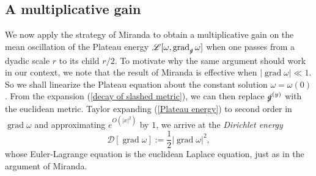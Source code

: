 \documentclass[reqno,12pt,letterpaper]{amsart}
\DeclareMathOperator{\grad}{grad}
\newcommand{\Lagrange}{\mathscr L}
\newcommand{\DirL}{\mathscr D}
\newcommand{\dfn}[1]{\emph{#1}\index{#1}}
\theoremstyle{definition}
\numberwithin{equation}{section}
\begin{document}
\subsection{A multiplicative gain}
We now apply the strategy of Miranda \cite[Teorema 4.3]{Miranda66} to obtain a multiplicative gain on the mean oscillation of the Plateau energy $\Lagrange[\omega, \grad_{\slashed g} \omega]$ when one passes from a dyadic scale $r$ to its child $r/2$.
To motivate why the same argument should work in our context, we note that the result of Miranda is effective when $|\grad \omega| \ll 1$.
So we shall linearize the Plateau equation about the constant solution $\omega = \omega(0)$.
From the expansion (\ref{decay of slashed metric}), we can then replace $\slashed g^{(y)}$ with the euclidean metric. Taylor expanding (\ref{Plateau energy}) to second order in $\grad \omega$ and approximating $e^{O(|x|^2)}$ by $1$, we arrive at the \dfn{Dirichlet energy}
$$\DirL[\grad \omega] := \frac{1}{2} |\grad \omega|^2,$$
whose Euler-Lagrange equation is the euclidean Laplace equation, just as in the argument of Miranda.

\printbibliography
\end{document}
